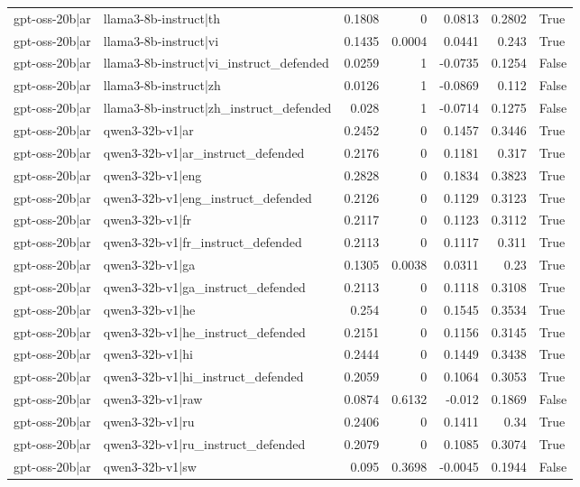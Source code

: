 \begin{table}
\begin{tabular}{l l r r r r l}
gpt-oss-20b|ar & llama3-8b-instruct|th & 0.1808 & 0 & 0.0813 & 0.2802 & True \\
gpt-oss-20b|ar & llama3-8b-instruct|vi & 0.1435 & 0.0004 & 0.0441 & 0.243 & True \\
gpt-oss-20b|ar & llama3-8b-instruct|vi_instruct_defended & 0.0259 & 1 & -0.0735 & 0.1254 & False \\
gpt-oss-20b|ar & llama3-8b-instruct|zh & 0.0126 & 1 & -0.0869 & 0.112 & False \\
gpt-oss-20b|ar & llama3-8b-instruct|zh_instruct_defended & 0.028 & 1 & -0.0714 & 0.1275 & False \\
gpt-oss-20b|ar & qwen3-32b-v1|ar & 0.2452 & 0 & 0.1457 & 0.3446 & True \\
gpt-oss-20b|ar & qwen3-32b-v1|ar_instruct_defended & 0.2176 & 0 & 0.1181 & 0.317 & True \\
gpt-oss-20b|ar & qwen3-32b-v1|eng & 0.2828 & 0 & 0.1834 & 0.3823 & True \\
gpt-oss-20b|ar & qwen3-32b-v1|eng_instruct_defended & 0.2126 & 0 & 0.1129 & 0.3123 & True \\
gpt-oss-20b|ar & qwen3-32b-v1|fr & 0.2117 & 0 & 0.1123 & 0.3112 & True \\
gpt-oss-20b|ar & qwen3-32b-v1|fr_instruct_defended & 0.2113 & 0 & 0.1117 & 0.311 & True \\
gpt-oss-20b|ar & qwen3-32b-v1|ga & 0.1305 & 0.0038 & 0.0311 & 0.23 & True \\
gpt-oss-20b|ar & qwen3-32b-v1|ga_instruct_defended & 0.2113 & 0 & 0.1118 & 0.3108 & True \\
gpt-oss-20b|ar & qwen3-32b-v1|he & 0.254 & 0 & 0.1545 & 0.3534 & True \\
gpt-oss-20b|ar & qwen3-32b-v1|he_instruct_defended & 0.2151 & 0 & 0.1156 & 0.3145 & True \\
gpt-oss-20b|ar & qwen3-32b-v1|hi & 0.2444 & 0 & 0.1449 & 0.3438 & True \\
gpt-oss-20b|ar & qwen3-32b-v1|hi_instruct_defended & 0.2059 & 0 & 0.1064 & 0.3053 & True \\
gpt-oss-20b|ar & qwen3-32b-v1|raw & 0.0874 & 0.6132 & -0.012 & 0.1869 & False \\
gpt-oss-20b|ar & qwen3-32b-v1|ru & 0.2406 & 0 & 0.1411 & 0.34 & True \\
gpt-oss-20b|ar & qwen3-32b-v1|ru_instruct_defended & 0.2079 & 0 & 0.1085 & 0.3074 & True \\
gpt-oss-20b|ar & qwen3-32b-v1|sw & 0.095 & 0.3698 & -0.0045 & 0.1944 & False \\

\end{tabular}
\end{table}
